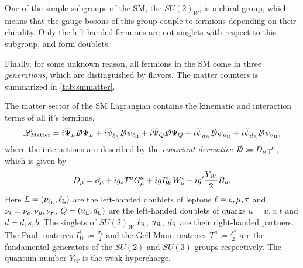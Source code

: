 One of the simple subgroups of the SM, the $SU(2)_W$, is a chiral group,
which means that the gauge bosons of this group couple to fermions depending on their chirality.
Only the left-handed fermions are not singlets with respect to this subgroup,
and form doublets.

Finally, for some unknown reason, all fermions in the SM come in three \emph{generations}, which 
are distinguished by flavors. The matter counters is summarized in \cref{tab:smmatter}.

The matter sector of the SM Lagrangian contains the kinematic and interaction
terms of all it's fermions,
\begin{equation}
  {\mathscr{L}}_{\text{Matter}} = i\overline\Psi_L\slashed{D}\Psi_L 
  + i\overline\psi_{\ell_{\mathrm{R}}}\slashed{D}\psi_{\ell_{\mathrm{R}}}
  + i\overline\Psi_Q\slashed{D}\Psi_Q
  + i\overline\psi_{u_{\mathrm{R}}}\slashed{D}\psi_{u_{\mathrm{R}}}
  + i\overline\psi_{d_{\mathrm{R}}}\slashed{D}\psi_{d_{\mathrm{R}}},
\end{equation}
where the interactions are described by the \emph{covariant derivative} $\slashed{D}\coloneqq D_{\mu}\gamma^\mu$, which is given by
\begin{equation}
  D_\mu = \partial_\mu
  +ig_{s} T^a G^a_\mu
  +i g I^i_W W^i_\mu
  +i g' \frac{Y_W}{2} B_\mu
  .
  \label{eq:D}
\end{equation}
Here $L=(\nu_{\ell_{\mathrm{L}}},\ell_{{\mathrm{L}}})$ are the left-handed doublets of leptons $\ell=e,\mu,\tau$ and $\nu_\ell=\nu_e,\nu_\mu,\nu_\tau$, 
$Q=(u_{\mathrm{L}},d_{\mathrm{L}})$ are the left-handed doublets of quarks $u={u,c,t}$ and $d={d,s,b}$.
The singlets of $SU(2)_W$ $\ell_{\mathrm{R}}$, $u_{\mathrm{R}}$, $d_{\mathrm{R}}$ are their right-handed partners.
The Pauli matrices $I^i_W \coloneqq \frac{\sigma_i}{2}$ and the Gell-Mann matrices $T^a \coloneqq \frac{\lambda^a}{2}$ are the fundamental generators of
the $SU(2)$ and $SU(3)$ groups respectively. The quantum number $Y_W$ is the weak hypercharge.



